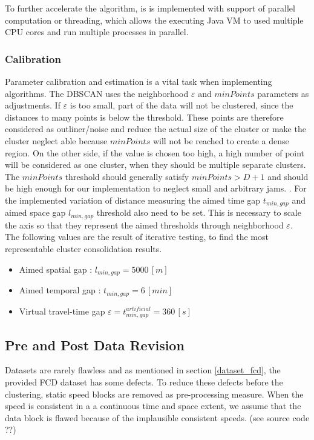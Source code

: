 
To further accelerate the algorithm, is is implemented with support of parallel computation or threading, which allows the executing Java VM to used multiple CPU cores and run multiple processes in parallel.

\subsubsection{Calibration}
Parameter calibration and estimation is a vital task when implementing algorithms. The DBSCAN uses the neighborhood $\varepsilon$ and $minPoints$ parameters as adjustments. If $\varepsilon$ is too small, part of the data will not be clustered, since the distances to many points is below the threshold. These points are therefore considered as outliner/noise and reduce the actual size of the cluster or make the cluster neglect able because $minPoints$ will not be reached to create a dense region. On the other side, if the value is chosen too high, a high number of point will be considered as one cluster, when they should be multiple separate clusters. The $minPoints$ threshold should generally satisfy $minPoints > D + 1$ and should be high enough for our implementation to neglect small and arbitrary jams. \parencite{Padro2017}. For the implemented variation of distance measuring the aimed time gap $t_{min,gap}$ and aimed space gap $l_{min,gap}$ threshold also need to be set. This is necessary to scale the axis so that they represent the aimed thresholds through neighborhood $\varepsilon$. The following values are the result of iterative testing, to find the most representable cluster consolidation results. 

\begin{itemize}
	\item Aimed spatial gap : $l_{min,gap} = 5000 \, [m]$
	\item Aimed temporal gap : $t_{min,gap} = 6 \, [min]$
	\item Virtual travel-time gap $\varepsilon = t_{min,gap}^{artificial} = 360 \, [s]$
\end{itemize}

\subsection{Pre and Post Data Revision}
Datasets are rarely flawless and as mentioned in section \ref{dataset_fcd}, the provided FCD dataset has some defects. To reduce these defects before the clustering, static speed blocks are removed as pre-processing measure. When the speed is consistent in a a continuous time and space extent, we assume that the data block is flawed because of the implausible consistent speeds. (see source code ??) 

